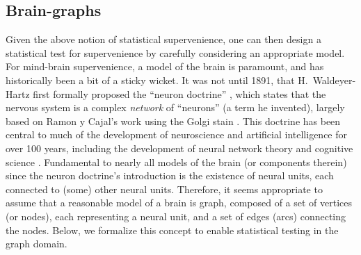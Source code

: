 \documentclass{article}
\newcommand{\PP}{\mathbb{P}}           %
\providecommand{\mc}[1]{\mathcal{#1}}
\begin{document}

\subsection{Brain-graphs} %
\label{sub:brain_graphs}

Given the above notion of statistical supervenience, one can then design a statistical test for supervenience by carefully considering an appropriate model.  For mind-brain supervenience, a model of the brain is paramount, and has historically been a bit of a sticky wicket.  It was not until 1891, that H.~Waldeyer-Hartz first formally proposed the ``neuron doctrine'' \cite{Waldeyer-Hartz1891}, which states that the nervous system is a complex \emph{network} of ``neurons'' (a term he invented), largely based on Ramon y Cajal's work using the Golgi stain \cite{Finger01}.  This doctrine has been central to much of the development of neuroscience and artificial intelligence for over 100 years, including the development of neural network theory \cite{Bishop95} and cognitive science \cite{McClellandRumelhart86}.  Fundamental to nearly all models of the brain (or components therein) since the neuron doctrine's introduction is the existence of neural units, each connected to (some) other neural units.  Therefore, it seems appropriate to assume that a reasonable model of a brain is graph, composed of a set of vertices (or nodes), each representing a neural unit, and a set of edges (arcs) connecting the nodes.  Below, we formalize this concept to enable statistical testing in the graph domain.
\end{document}
